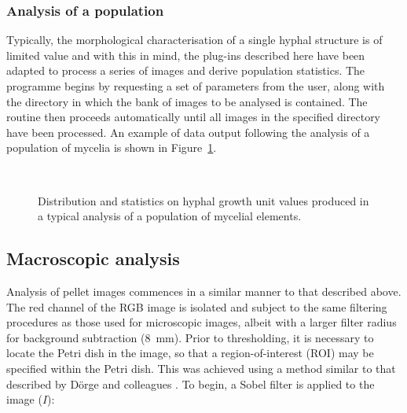 \subsubsection{Analysis of a population}

Typically, the morphological characterisation of a single hyphal structure is of limited value and with this in mind, the plug-ins described here have been adapted to process a series of images and derive population statistics. The programme begins by requesting a set of parameters from the user, along with the directory in which the bank of images to be analysed is contained. The routine then proceeds automatically until all images in the specified directory have been processed. An example of data output following the analysis of a population of mycelia is shown in Figure~\ref{fig:HGUResult}.

\begin{figure}[t]
	\centering
	\\
  \caption{Distribution and statistics on hyphal growth unit values produced in a typical analysis of a population of mycelial elements.}
  \label{fig:HGUResult}
\end{figure}

\subsection{Macroscopic analysis}\label{sec:MacroAnalysis}

Analysis of pellet images commences in a similar manner to that described above. The red channel of the RGB image is isolated and subject to the same filtering procedures as those used for microscopic images, albeit with a larger filter radius for background subtraction (8~mm). Prior to thresholding, it is necessary to locate the Petri dish in the image, so that a region-of-interest (ROI) may be specified within the Petri dish. This was achieved using a method similar to that described by D\"{o}rge and colleagues \cite{dorge2000}. To begin, a Sobel filter is applied to the image ($I$):

